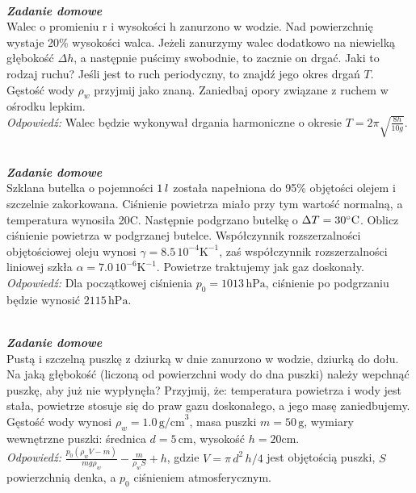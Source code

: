 \documentclass[11pt,a4paper]{article}
\newcounter{zaddom}\newcommand{\zaddom}[1][]{\addtocounter{zaddom}{1} ~\\  {\bf \emph{Zadanie domowe \arabic{zaddom} #1 }} \\}
\begin{document}
\zaddom
Walec o promieniu r i wysokości h zanurzono w wodzie. Nad powierzchnię wystaje 20\% wysokości walca. Jeżeli zanurzymy walec dodatkowo na niewielką głębokość $\Delta h$, a następnie puścimy swobodnie, to zacznie on drgać. Jaki to rodzaj ruchu? Jeśli jest to ruch periodyczny, to znajdź jego okres drgań $T$. Gęstość wody $\rho_w$ przyjmij jako znaną. Zaniedbaj opory związane z ruchem w ośrodku lepkim.\\
{\em Odpowiedź:} Walec będzie wykonywał drgania harmoniczne o okresie $T = 2\pi \sqrt{\frac{8h}{10g}}$.

\zaddom
Szklana butelka o pojemności $1\textrm\,{l}$ została napełniona do 95\% objętości olejem i szczelnie zakorkowana. Ciśnienie powietrza miało przy tym wartość normalną, a temperatura wynosiła 20\degree C. Następnie podgrzano butelkę o $\Delta T = 30\degree\textrm{C}$. Oblicz ciśnienie powietrza w podgrzanej butelce. Współczynnik rozszerzalności objętościowej oleju wynosi $\gamma = 8.5\,10^{-4} \textrm{K}^{-1}$, zaś współczynnik rozszerzalności liniowej szkła $\alpha  = 7.0\,10^{-6} \textrm{K}^{-1}$. Powietrze traktujemy jak gaz doskonały.\\
{\em Odpowiedź:} Dla początkowej ciśnienia $p_0 = 1013\,\textrm{hPa}$, ciśnienie po podgrzaniu będzie wynosić $2115\,\textrm{hPa}$.

\zaddom
Pustą i szczelną puszkę z dziurką w dnie zanurzono w wodzie, dziurką do dołu. Na jaką głębokość (liczoną od powierzchni wody do dna puszki) należy wepchnąć puszkę, aby już nie wypłynęła? Przyjmij, że: temperatura powietrza i wody jest stała, powietrze stosuje się do praw gazu doskonałego, a jego masę zaniedbujemy. Gęstość wody wynosi $\rho_w = 1.0\,\textrm{g/cm}^3$, masa puszki $m = 50\,\textrm{g}$, wymiary wewnętrzne puszki: średnica $d = 5\,\textrm{cm}$, wysokość $h = 20\textrm{cm}$.\\
{\em Odpowiedź:} $\frac{p_0(\rho_w V-m)}{mg\rho_w} - \frac{m}{\rho_wS} + h$,
gdzie $V = \pi\,d^2\,h/4$ jest objętością puszki, $S$ powierzchnią denka, a $p_0$ ciśnieniem atmosferycznym.
\end{document}
